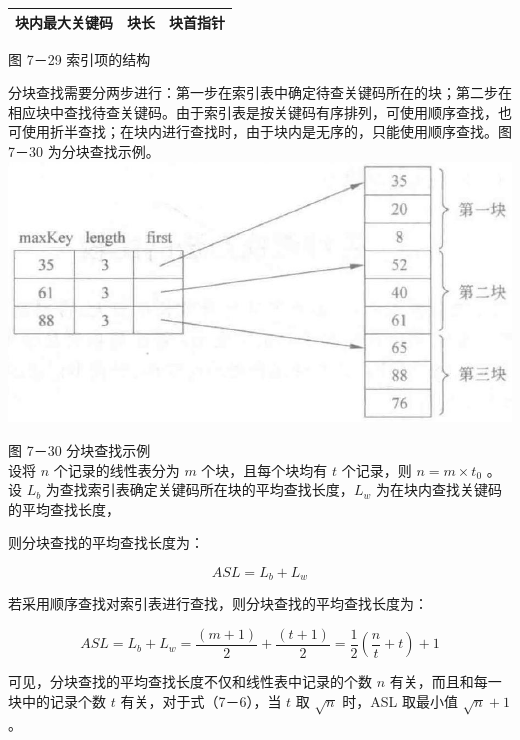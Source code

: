 \documentclass[10pt]{article}
\begin{document}
\begin{center}
\begin{tabular}{|c|c|c|}
\hline
块内最大关键码 & 块长 & 块首指针 \\
\hline
\end{tabular}
\end{center}

图 7－29 索引项的结构

分块查找需要分两步进行：第一步在索引表中确定待查关键码所在的块；第二步在相应块中查找待查关键码。由于索引表是按关键码有序排列，可使用顺序查找，也可使用折半查找；在块内进行查找时，由于块内是无序的，只能使用顺序查找。图 7－30 为分块查找示例。\\
\includegraphics[max width=\textwidth, center]{2025_06_06_704745ea57b15b2333e5g-261}

图 7－30 分块查找示例\\
设将 $n$ 个记录的线性表分为 $m$ 个块，且每个块均有 $t$ 个记录，则 $n=m \times t_{0}$ 。设 $L_{b}$ 为查找索引表确定关键码所在块的平均查找长度，$L_{w}$ 为在块内查找关键码的平均查找长度，

则分块查找的平均查找长度为：


\begin{equation*}
A S L=L_{b}+L_{w} \tag{7-5}
\end{equation*}


若采用顺序查找对索引表进行查找，则分块查找的平均查找长度为：


\begin{equation*}
A S L=L_{b}+L_{w}=\frac{(m+1)}{2}+\frac{(t+1)}{2}=\frac{1}{2}\left(\frac{n}{t}+t\right)+1 \tag{7-6}
\end{equation*}


可见，分块查找的平均查找长度不仅和线性表中记录的个数 $n$ 有关，而且和每一块中的记录个数 $t$ 有关，对于式（7－6），当 $t$ 取 $\sqrt{n}$ 时，ASL 取最小值 $\sqrt{n}+1$ 。
\end{document}
